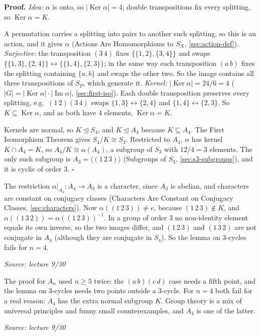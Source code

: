 \documentclass[11pt]{report}
\renewenvironment{proof}[1][Proof]{\noindent\textbf{#1.} }{\hfill$\square$\par\vspace{5pt}}
\newcommand{\srcline}[1]{\par\hfill{\footnotesize\textit{Source: #1}}}
\begin{document}
\begin{proof}
\textit{Idea:} $\alpha$ is onto, so $|\operatorname{Ker}\alpha| = 4$; double transpositions fix every splitting, so $\operatorname{Ker}\alpha = K$.\par
A permutation carries a splitting into pairs to another such splitting, so this is an action, and it gives $\alpha$ (Actions Are Homomorphisms to $S_X$, \ref{sec:action-def}). \emph{Surjective:} the transposition $(3\,4)$ fixes $\{\{1,2\},\{3,4\}\}$ and swaps $\{\{1,3\},\{2,4\}\} \leftrightarrow \{\{1,4\},\{2,3\}\}$; in the same way each transposition $(a\,b)$ fixes the splitting containing $\{a, b\}$ and swaps the other two. So the image contains all three transpositions of $S_P$, which generate it. \emph{Kernel:} $|\operatorname{Ker}\alpha| = 24/6 = 4$ ($|G| = |\operatorname{Ker}\alpha| \cdot |\operatorname{Im}\alpha|$, \ref{sec:first-iso}). Each double transposition preserves every splitting, e.g.\ $(1\,2)(3\,4)$ swaps $\{1,3\} \leftrightarrow \{2,4\}$ and $\{1,4\} \leftrightarrow \{2,3\}$. So $K \subseteq \operatorname{Ker}\alpha$, and as both have $4$ elements, $\operatorname{Ker}\alpha = K$.

Kernels are normal, so $K \trianglelefteq S_4$, and $K \trianglelefteq A_4$ because $K \subseteq A_4$. The First Isomorphism Theorem gives $S_4/K \cong S_3$. Restricted to $A_4$, $\alpha$ has kernel $K \cap A_4 = K$, so $A_4/K \cong \alpha(A_4)$, a subgroup of $S_3$ with $12/4 = 3$ elements. The only such subgroup is $A_3 = \langle (1\,2\,3) \rangle$ (Subgroups of $S_3$, \ref{sec:s3-subgroups}), and it is cyclic of order $3$.
\end{proof}

\begin{exbox}\label{ex:a4-1-2-3-1-3-2-not-conjugate}
The restriction $\alpha|_{A_4}: A_4 \to A_3$ is a character, since $A_3$ is abelian, and characters are constant on conjugacy classes (Characters Are Constant on Conjugacy Classes, \ref{sec:characters}). Now $\alpha((1\,2\,3)) \neq e$, because $(1\,2\,3) \notin K$, and $\alpha((1\,3\,2)) = \alpha((1\,2\,3))^{-1}$. In a group of order $3$ no non-identity element equals its own inverse, so the two images differ, and $(1\,2\,3)$ and $(1\,3\,2)$ are not conjugate in $A_4$ (although they are conjugate in $S_4$). So the lemma on $3$-cycles fails for $n = 4$.
\srcline{lecture 9/30}
\end{exbox}

\begin{rembox}\label{rem:why-n-ge-5}
The proof for $A_n$ used $n \geq 5$ twice: the $(a\,b)(c\,d)$ case needs a fifth point, and the lemma on $3$-cycles needs two points outside a $3$-cycle. For $n = 4$ both fail for a real reason: $A_4$ has the extra normal subgroup $K$. Group theory is a mix of universal principles and funny small counterexamples, and $A_4$ is one of the latter.
\srcline{lecture 9/30}
\end{rembox}
\end{document}
